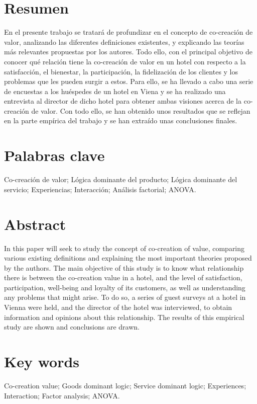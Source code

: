 \section*{Resumen}

En el presente trabajo se tratará de profundizar en el concepto de co-creación de valor, analizando las diferentes definiciones existentes, y explicando las teorías más relevantes propuestas por los autores. Todo ello, con el principal objetivo de conocer qué relación tiene la co-creación de valor en un hotel con respecto a la satisfacción, el bienestar, la participación, la fidelización de los clientes y los problemas que les pueden surgir a estos. Para ello, se ha llevado a cabo una serie de encuestas a los huéspedes de un hotel en Viena y se ha realizado una entrevista al director de dicho hotel para obtener ambas visiones acerca de la co-creación de valor. Con todo ello, se han obtenido unos resultados que se reflejan en la parte empírica del trabajo y se han extraído unas conclusiones finales.

\section*{Palabras clave}

Co-creación de valor; Lógica dominante del producto; Lógica dominante del servicio; Experiencias; Interacción; Análisis factorial; ANOVA.

\section*{Abstract}

In this paper will seek to study the concept of co-creation of value, comparing various existing definitions and explaining the most important theories proposed by the authors. The main objective of this study is to know what relationship there is between the co-creation value in a hotel, and the level of satisfaction, participation, well-being and loyalty of its customers, as well as understanding any problems that might arise. To do so, a series of guest surveys at a hotel in Vienna were held, and the director of the hotel was interviewed, to obtain information and opinions about this relationship. The results of this empirical study are shown and conclusions are drawn. 


\section*{Key words}

Co-creation value; Goods dominant logic; Service dominant logic; Experiences; Interaction; Factor analysis; ANOVA.


